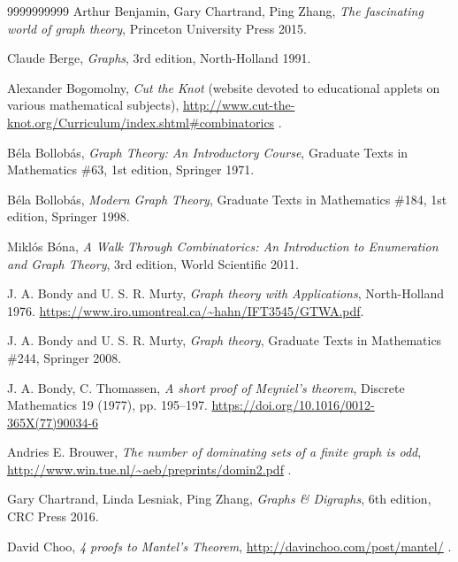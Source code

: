 \documentclass[numbers=enddot,12pt,final,onecolumn,notitlepage]{scrartcl}%
\theoremstyle{definition}
\begin{document}
\begin{thebibliography}{9999999999}
Arthur Benjamin, Gary Chartrand,
Ping Zhang,
\textit{The fascinating world of graph theory},
Princeton University Press 2015.

Claude Berge,
\textit{Graphs}, 3rd edition, North-Holland 1991.

Alexander Bogomolny,
\textit{Cut the Knot} (website devoted to educational applets on
various mathematical subjects),
\url{http://www.cut-the-knot.org/Curriculum/index.shtml#combinatorics} .

B\'ela Bollob\'as,
\textit{Graph Theory: An Introductory Course},
Graduate Texts in Mathematics \#63, 1st edition, Springer 1971.

B\'ela Bollob\'as,
\textit{Modern Graph Theory},
Graduate Texts in Mathematics \#184, 1st edition, Springer 1998.

Mikl\'os B\'ona,
\textit{A Walk Through Combinatorics:
An Introduction to Enumeration and Graph Theory},
3rd edition, World Scientific 2011.

J. A. Bondy and U. S. R. Murty, \textit{Graph theory with Applications},
North-Holland 1976.
\newline \url{https://www.iro.umontreal.ca/~hahn/IFT3545/GTWA.pdf}.

J. A. Bondy and U. S. R. Murty, \textit{Graph theory}, Graduate Texts
in Mathematics \#244, Springer 2008.

J. A. Bondy, C. Thomassen,
\textit{A short proof of Meyniel's theorem},
Discrete Mathematics 19 (1977), pp. 195--197.
\newline \url{https://doi.org/10.1016/0012-365X(77)90034-6}

Andries E. Brouwer,
\textit{The number of dominating sets of a finite graph is odd},
\url{http://www.win.tue.nl/~aeb/preprints/domin2.pdf} .


Gary Chartrand, Linda Lesniak, Ping Zhang,
\textit{Graphs \& Digraphs}, 6th edition, CRC Press 2016.

David Choo,
\textit{4 proofs to Mantel's Theorem},
\url{http://davinchoo.com/post/mantel/} .


\end{thebibliography}
\end{document}
